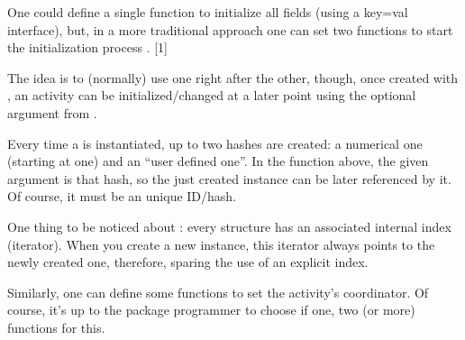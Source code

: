 \documentclass[10pt]{article}
\begin{document}
\begin{codestore}[ActivityUseDemo]
  
  
  
\end{codestore}


\begin{codestore}[ActivityUseDemo]
   

  
\end{codestore}


One could define a single function to initialize all fields (using a key=val interface), but, in a more traditional approach  one can set two functions to start the initialization process \tsobj{\NewActivity,\ActivitySet}. 
[1]

The idea is to (normally) use one right after the other, though, once created with \tsobj{\NewActivity}, an activity can be initialized/changed at a later point using the optional argument from \tsobj{\ActivitySet}.
\begin{tsremark}
  Every time a  is instantiated, up to two hashes are created: a numerical one (starting at one) and an ``user defined one''. In the \tsobj{\NewActivity} function above, the given argument is that hash, so the just created instance can be later referenced by it. Of course, it must be an unique ID/hash.
\end{tsremark}
\begin{tsremark}
  One thing to be noticed about : every structure has an associated internal index (iterator). When you create a new instance, this iterator always points to the newly created one, therefore, sparing the use of an explicit index.
\end{tsremark}

%
%

Similarly, one can define some functions to set the activity's coordinator. Of course, it's up to the package programmer to choose if one, two (or more) functions for this.
\end{document}
